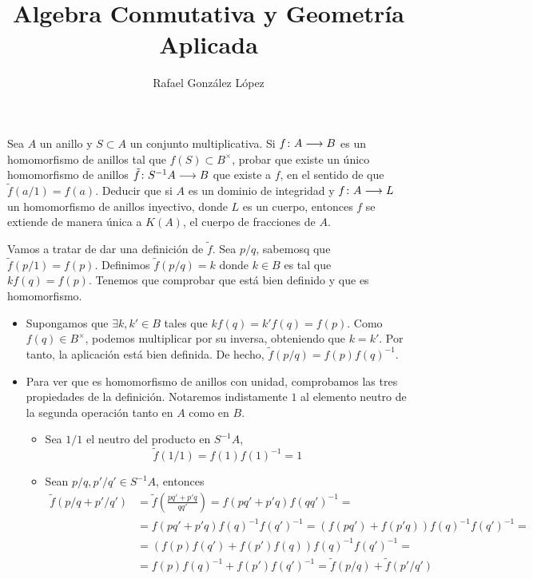 \documentclass[twoside]{article}
\begin{document}
\title{Algebra Conmutativa y Geometría Aplicada}
\author{Rafael González López}
\maketitle

\begin{ejercicio}{1}
Sea $A$ un anillo y $S\subset A$ un conjunto multiplicativa. Si $f\colon{A}\longrightarrow{B}$ es un homomorfismo de anillos tal que $f(S)\subset B^\times$, probar que existe un único homomorfismo de anillos $\tilde{f}\colon{S^{-1}A}\longrightarrow{B}$ que existe a $f$, en el sentido de que $\tilde{f}(a/1) = f(a)$.
\newline
Deducir que si $A$ es un dominio de integridad y $f\colon{A}\longrightarrow{L}$ un homomorfismo de anillos inyectivo, donde $L$ es un cuerpo, entonces $f$ se extiende de manera única a $K(A)$, el cuerpo de fracciones de $A$.
\begin{solucion}
Vamos a tratar de dar una definición de $\tilde{f}$. Sea $p/q$, sabemosq que $\tilde{f}(p/1)=f(p)$. Definimos $\tilde{f}(p/q)=k$ donde $k\in B$ es tal que $kf(q)=f(p)$. Tenemos que comprobar que está bien definido y que es homomorfismo.
\begin{itemize}
\item Supongamos que $\exists k,k'\in B$ tales que $kf(q)=k'f(q)=f(p)$. Como $f(q)\in B^\times$, podemos multiplicar por su inversa, obteniendo que $k=k'$. Por tanto, la aplicación está bien definida. De hecho, $\tilde{f}(p/q)=f(p)f(q)^{-1}$.
\item Para ver que es homomorfismo de anillos con unidad, comprobamos las tres propiedades de la definición. Notaremos indistamente $1$ al elemento neutro de la segunda operación tanto en $A$ como en $B$.
\begin{itemize}
\item Sea $1/1$ el neutro del producto en $S^{-1}A$, 
$$\tilde{f}(1/1)=f(1)f(1)^{-1}=1$$
\item Sean $p/q,p'/q' \in S^{-1}A$, entonces
\begin{align*}
\tilde{f}(p/q+p'/q') &= 	\tilde{f}\left(\frac{pq'+p'q}{qq'}\right) = f(pq'+p'q)f(qq')^{-1} = \\
 &= f(pq'+p'q)f(q)^{-1}f(q')^{-1} =
(f(pq')+f(p'q))f(q)^{-1}f(q')^{-1} = \\
&= (f(p)f(q')+f(p')f(q))f(q)^{-1}f(q')^{-1}  =\\
 &= f(p)f(q)^{-1}+f(p')f(q')^{-1} = \tilde{f}(p/q)+\tilde{f}(p'/q')
\end{align*}


\end{itemize}
\end{itemize}
\end{solucion}
\end{ejercicio}
\end{document}
